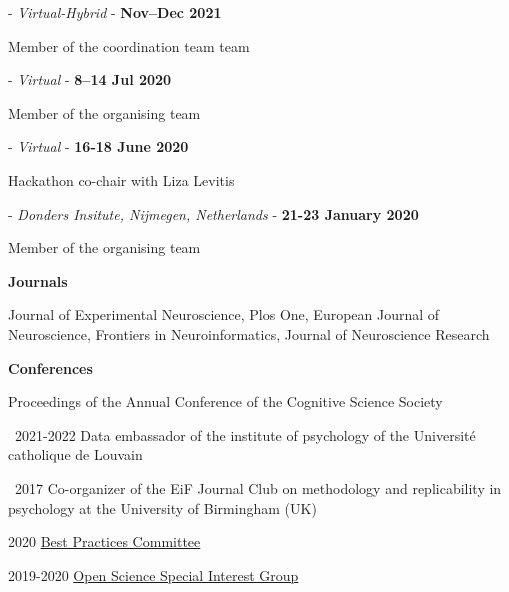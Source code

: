 
 - \textit{Virtual-Hybrid} - \textbf{Nov--Dec 2021}

Member of the coordination team team


%
 - \textit{Virtual} - \textbf{8--14 Jul 2020}

Member of the organising team


%
 - \textit{Virtual} - \textbf{16-18 June 2020}

Hackathon co-chair with Liza Levitis


%
 - \textit{Donders Insitute, Nijmegen, Netherlands} - \textbf{21-23 January 2020}

Member of the organising team




\textbf{Journals}

Journal of Experimental Neuroscience, Plos One, European Journal of Neuroscience, Frontiers in Neuroinformatics, Journal of Neuroscience Research

\textbf{Conferences}

Proceedings of the Annual Conference of the Cognitive Science Society



\textbullet~2021-2022 Data embassador of the institute of psychology of the Université catholique de Louvain

\textbullet~2017 Co-organizer of the EiF Journal Club on methodology and replicability in psychology at the University of Birmingham (UK)




\begin{description}
    \item 2020 \href{https://www.humanbrainmapping.org/i4a/pages/index.cfm?pageid=4027}{Best Practices Committee}
    \item 2019-2020 \href{https://www.humanbrainmapping.org/i4a/pages/index.cfm?pageID=3712}{Open Science Special Interest Group} 
\end{description}


